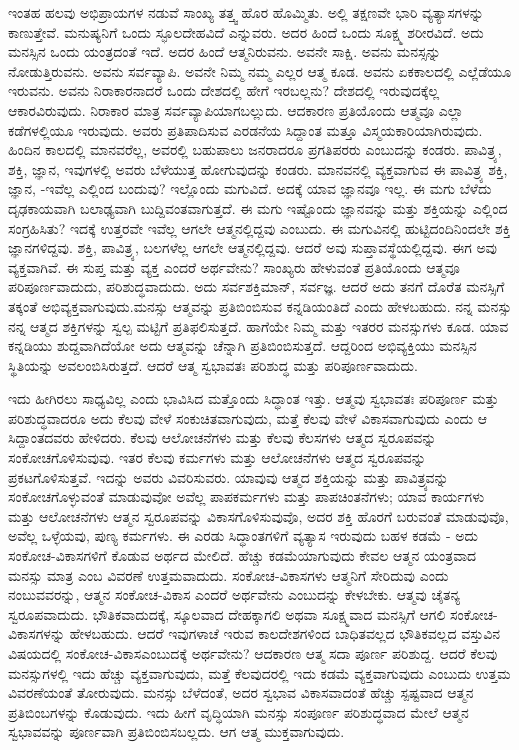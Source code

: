 ಇಂತಹ ಹಲವು ಅಭಿಪ್ರಾಯಗಳ ನಡುವೆ ಸಾಂಖ್ಯ ತತ್ತ್ವ ಹೊರ ಹೊಮ್ಮಿತು. ಅಲ್ಲಿ ತಕ್ಷಣವೇ ಭಾರಿ ವ್ಯತ್ಯಾಸಗಳನ್ನು ಕಾಣುತ್ತೇವೆ. ಮನುಷ್ಯನಿಗೆ ಒಂದು ಸ್ಫೂಲದೇಹವಿದೆ ಎನ್ನುವರು. ಅದರ ಹಿಂದೆ ಒಂದು ಸೂಕ್ಷ್ಮ ಶರೀರವಿದೆ. ಅದು ಮನಸ್ಸಿನ ಒಂದು ಯಂತ್ರದಂತೆ ಇದೆ. ಅದರ ಹಿಂದೆ ಆತ್ಮನಿರುವನು. ಅವನೇ ಸಾಕ್ಷಿ. ಅವನು ಮನಸ್ಸನ್ನು ನೋಡುತ್ತಿರುವನು. ಅವನು ಸರ್ವವ್ಯಾಪಿ. ಅವನೇ ನಿಮ್ಮ ನಮ್ಮ ಎಲ್ಲರ ಆತ್ಮ ಕೂಡ. ಅವನು ಏಕಕಾಲದಲ್ಲಿ ಎಲ್ಲೆಡೆಯೂ ಇರುವನು. ಅವನು ನಿರಾಕಾರನಾದರೆ ಒಂದು ದೇಶದಲ್ಲಿ ಹೇಗೆ ಇರಬಲ್ಲನು? ದೇಶದಲ್ಲಿ ಇರುವುದಕ್ಕೆಲ್ಲ ಆಕಾರವಿರುವುದು. ನಿರಾಕಾರ ಮಾತ್ರ ಸರ್ವವ್ಯಾಪಿಯಾಗಬಲ್ಲುದು. ಆದಕಾರಣ ಪ್ರತಿಯೊಂದು ಆತ್ಮವೂ ಎಲ್ಲಾ ಕಡೆಗಳಲ್ಲಿಯೂ ಇರುವುದು. ಅವರು ಪ್ರತಿಪಾದಿಸುವ ಎರಡನೆಯ ಸಿದ್ದಾಂತ ಮತ್ತೂ ವಿಸ್ಮಯಕಾರಿಯಾಗಿರುವುದು. ಹಿಂದಿನ ಕಾಲದಲ್ಲಿ ಮಾನವರೆಲ್ಲ, ಅವರಲ್ಲಿ ಬಹುಪಾಲು ಜನರಾದರೂ ಪ್ರಗತಿಪರರು ಎಂಬುದನ್ನು ಕಂಡರು. ಪಾವಿತ್ರ್ಯ, ಶಕ್ತಿ, ಜ್ಞಾನ, ಇವುಗಳಲ್ಲಿ ಅವರು ಬೆಳೆಯುತ್ತ ಹೋಗುವುದನ್ನು ಕಂಡರು. ಮಾನವನಲ್ಲಿ ವ್ಯಕ್ತವಾಗುವ ಈ ಪಾವಿತ್ರ್ಯ ಶಕ್ತಿ, ಜ್ಞಾನ, -ಇವೆಲ್ಲ ಎಲ್ಲಿಂದ ಬಂದುವು? ಇಲ್ಲೊಂದು ಮಗುವಿದೆ. ಅದಕ್ಕೆ ಯಾವ ಜ್ಞಾನವೂ ಇಲ್ಲ. ಈ ಮಗು ಬೆಳೆದು ದೃಢಕಾಯವಾಗಿ ಬಲಾಢ್ಯವಾಗಿ ಬುದ್ದಿವಂತವಾಗುತ್ತದೆ. ಈ ಮಗು ಇಷ್ಟೊಂದು ಜ್ಞಾನವನ್ನು ಮತ್ತು ಶಕ್ತಿಯನ್ನು ಎಲ್ಲಿಂದ ಸಂಗ್ರಹಿಸಿತು? ಇದಕ್ಕೆ ಉತ್ತರವೇ ಇವೆಲ್ಲ ಆಗಲೇ ಆತ್ಮನಲ್ಲಿದ್ದವು ಎಂಬುದು. ಈ ಮಗುವಿನಲ್ಲಿ ಹುಟ್ಟಿದಂದಿನಿಂದಲೇ ಶಕ್ತಿ ಜ್ಞಾನಗಳಿದ್ದವು. ಶಕ್ತಿ, ಪಾವಿತ್ರ್ಯ, ಬಲಗಳೆಲ್ಲ ಆಗಲೇ ಆತ್ಮನಲ್ಲಿದ್ದವು. ಆದರೆ ಅವು ಸುಪ್ತಾವಸ್ಥೆಯಲ್ಲಿದ್ದವು. ಈಗ ಅವು ವ್ಯಕ್ತವಾಗಿವೆ. ಈ ಸುಪ್ತ ಮತ್ತು ವ್ಯಕ್ತ ಎಂದರೆ ಅರ್ಥವೇನು? ಸಾಂಖ್ಯರು ಹೇಳುವಂತೆ ಪ್ರತಿಯೊಂದು ಆತ್ಮವೂ ಪರಿಪೂರ್ಣವಾದುದು, ಪರಿಶುದ್ಧವಾದುದು. ಅದು ಸರ್ವಶಕ್ತಿಮಾನ್, ಸರ್ವಜ್ಞ. ಆದರೆ ಅದು ತನಗೆ ದೊರೆತ ಮನಸ್ಸಿಗೆ ತಕ್ಕಂತೆ ಅಭಿವ್ಯಕ್ತವಾಗುವುದು.\break ಮನಸ್ಸು ಆತ್ಮವನ್ನು ಪ್ರತಿಬಿಂಬಿಸುವ ಕನ್ನಡಿಯಂತಿದೆ ಎಂದು ಹೇಳಬಹುದು. ನನ್ನ ಮನಸ್ಸು ನನ್ನ ಆತ್ಮದ ಶಕ್ತಿಗಳನ್ನು ಸ್ವಲ್ಪ ಮಟ್ಟಿಗೆ ಪ್ರತಿಫಲಿಸುತ್ತದೆ. ಹಾಗೆಯೇ ನಿಮ್ಮ ಮತ್ತು ಇತರರ ಮನಸ್ಸುಗಳು ಕೂಡ. ಯಾವ ಕನ್ನಡಿಯು ಶುದ್ದವಾಗಿದೆಯೋ ಅದು ಆತ್ಮವನ್ನು ಚೆನ್ನಾಗಿ ಪ್ರತಿಬಿಂಬಿಸುತ್ತದೆ. ಆದ್ದರಿಂದ ಅಭಿವ್ಯಕ್ತಿಯು ಮನಸ್ಸಿನ ಸ್ಥಿತಿಯನ್ನು ಅವಲಂಬಿಸಿರುತ್ತದೆ. ಆದರೆ ಆತ್ಮ ಸ್ವಭಾವತಃ ಪರಿಶುದ್ಧ ಮತ್ತು ಪರಿಪೂರ್ಣವಾದುದು.

ಇದು ಹೀಗಿರಲು ಸಾಧ್ಯವಿಲ್ಲ ಎಂದು ಭಾವಿಸಿದ ಮತ್ತೊಂದು ಸಿದ್ಧಾಂತ ಇತ್ತು. ಆತ್ಮವು ಸ್ವಭಾವತಃ ಪರಿಪೂರ್ಣ ಮತ್ತು ಪರಿಶುದ್ಧವಾದರೂ ಅದು ಕೆಲವು ವೇಳೆ ಸಂಕುಚಿತವಾಗುವುದು, ಮತ್ತೆ ಕೆಲವು ವೇಳೆ ವಿಕಾಸವಾಗುವುದು ಎಂದು ಆ ಸಿದ್ದಾಂತದವರು ಹೇಳಿದರು. ಕೆಲವು ಆಲೋಚನೆಗಳು ಮತ್ತು ಕೆಲವು ಕೆಲಸಗಳು ಆತ್ಮದ ಸ್ವರೂಪವನ್ನು ಸಂಕೋಚಗೊಳಿಸುವುವು. ಇತರ ಕೆಲವು ಕರ್ಮಗಳು ಮತ್ತು ಆಲೋಚನೆಗಳು ಆತ್ಮದ ಸ್ವರೂಪವನ್ನು ಪ್ರಕಟಗೊಳಿಸುತ್ತವೆ. ಇದನ್ನು ಅವರು ವಿವರಿಸುವರು. ಯಾವುವು ಆತ್ಮದ ಶಕ್ತಿಯನ್ನು ಮತ್ತು ಪಾವಿತ್ರ್ಯವನ್ನು ಸಂಕೋಚಗೊಳ್ಳುವಂತೆ ಮಾಡುವುವೋ ಅವೆಲ್ಲ ಪಾಪಕರ್ಮಗಳು ಮತ್ತು ಪಾಪಚಿಂತನೆಗಳು; ಯಾವ ಕಾರ್ಯಗಳು ಮತ್ತು ಆಲೋಚನೆಗಳು ಆತ್ಮನ ಸ್ವರೂಪವನ್ನು ವಿಕಾಸಗೊಳಿಸುವುವೊ, ಅದರ ಶಕ್ತಿ ಹೊರಗೆ ಬರುವಂತೆ ಮಾಡುವುವೊ, ಅವೆಲ್ಲ ಒಳ್ಳೆಯವು, ಪುಣ್ಯ ಕರ್ಮಗಳು. ಈ ಎರಡು ಸಿದ್ಧಾಂತಗಳಿಗೆ ವ್ಯತ್ಯಾಸ ಇರುವುದು ಬಹಳ ಕಡಮೆ - ಅದು ಸಂಕೋಚ-ವಿಕಾಸಗಳಿಗೆ ಕೊಡುವ ಅರ್ಥದ ಮೇಲಿದೆ. ಹೆಚ್ಚು ಕಡಮೆಯಾಗುವುದು ಕೇವಲ ಆತ್ಮನ ಯಂತ್ರವಾದ ಮನಸ್ಸು ಮಾತ್ರ ಎಂಬ ವಿವರಣೆ ಉತ್ತಮವಾದುದು. ಸಂಕೋಚ-ವಿಕಾಸಗಳು ಆತ್ಮನಿಗೆ ಸೇರಿದುವು ಎಂದು ನಂಬುವವರನ್ನು, ಆತ್ಮನ ಸಂಕೋಚ-ವಿಕಾಸ ಎಂದರೆ ಅರ್ಥವೇನು ಎಂಬುದನ್ನು ಕೇಳಬೇಕು. ಆತ್ಮವು ಚೈತನ್ಯ ಸ್ವರೂಪವಾದುದು. ಭೌತಿಕವಾದುದಕ್ಕೆ, ಸ್ಕೂಲವಾದ ದೇಹಕ್ಕಾಗಲಿ ಅಥವಾ ಸೂಕ್ಷ್ಮವಾದ ಮನಸ್ಸಿಗೆ ಆಗಲಿ ಸಂಕೋಚ-ವಿಕಾಸಗಳನ್ನು ಹೇಳಬಹುದು. ಆದರೆ ಇವುಗಳಾಚೆ ಇರುವ ಕಾಲದೇಶಗಳಿಂದ ಬಾಧಿತವಲ್ಲದ ಭೌತಿಕವಲ್ಲದ ವಸ್ತುವಿನ ವಿಷಯದಲ್ಲಿ ಸಂಕೋಚ-ವಿಕಾಸ\break ಎಂಬುದಕ್ಕೆ ಅರ್ಥವೇನು? ಆದಕಾರಣ ಆತ್ಮ ಸದಾ ಪೂರ್ಣ ಪರಿಶುದ್ದ. ಆದರೆ ಕೆಲವು ಮನಸ್ಸುಗಳಲ್ಲಿ ಇದು ಹೆಚ್ಚು ವ್ಯಕ್ತವಾಗುವುದು, ಮತ್ತೆ ಕೆಲವುದರಲ್ಲಿ ಇದು ಕಡಮೆ ವ್ಯಕ್ತವಾಗುವುದು ಎಂಬುದು ಉತ್ತಮ ವಿವರಣೆಯಂತೆ ತೋರುವುದು. ಮನಸ್ಸು ಬೆಳೆದಂತೆ, ಅದರ ಸ್ವಭಾವ ವಿಕಾಸವಾದಂತೆ ಹೆಚ್ಚು ಸ್ಪಷ್ಟವಾದ ಆತ್ಮನ ಪ್ರತಿಬಿಂಬಗಳನ್ನು ಕೊಡುವುದು. ಇದು ಹೀಗೆ ವೃದ್ಧಿಯಾಗಿ ಮನಸ್ಸು ಸಂಪೂರ್ಣ ಪರಿಶುದ್ಧವಾದ ಮೇಲೆ ಆತ್ಮನ ಸ್ವಭಾವವನ್ನು ಪೂರ್ಣವಾಗಿ ಪ್ರತಿಬಿಂಬಿಸಬಲ್ಲದು. ಆಗ ಆತ್ಮ ಮುಕ್ತವಾಗುವುದು.


